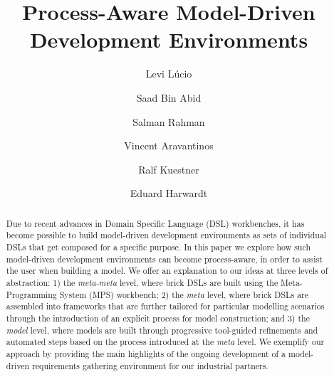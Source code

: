 \documentclass{llncs}
\begin{document}
%
\frontmatter          %

\mainmatter              %
%
\title{Process-Aware Model-Driven Development Environments}
%
\titlerunning{}  %
%
\author{Levi L\'ucio \and Saad Bin Abid
 \and Salman Rahman \and Vincent
Aravantinos \and Ralf Kuestner\and Eduard Harwardt}
%
\authorrunning{} %
%
\tocauthor{}
%

\maketitle            

\begin{abstract}
Due to recent advances in Domain Specific Language (DSL) workbenches, it has
become possible to build model-driven development environments as sets of
individual DSLs that get composed for a specific purpose.
In this paper we explore how such model-driven development environments can
become process-aware, in order to assist the user when building a model.
We offer an explanation to our ideas at three levels of abstraction:
1) the \emph{meta-meta} level, where brick DSLs are built using the
Meta-Programming System (MPS) workbench; 2) the \emph{meta} level, where brick
DSLs are assembled into frameworks that are further tailored for
particular modelling scenarios through the introduction of an explicit process
for model construction; and 3) the \emph{model} level, where
models are built through progressive tool-guided refinements and automated
steps based on the process introduced at the \emph{meta} level.
We exemplify our approach by providing the main highlights of the ongoing
development of a model-driven requirements gathering environment for our
industrial partners.


\end{abstract} 
\end{document}
